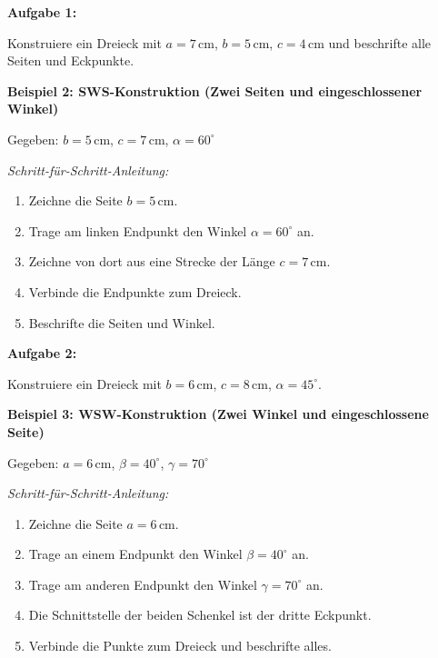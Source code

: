 \vspace{0.5em}

\textbf{Aufgabe 1:}

Konstruiere ein Dreieck mit $a=7\,\mathrm{cm}$, $b=5\,\mathrm{cm}$, $c=4\,\mathrm{cm}$ und beschrifte alle Seiten und Eckpunkte.

\vspace{0.5em}

\textbf{Beispiel 2: SWS-Konstruktion (Zwei Seiten und eingeschlossener Winkel)}

Gegeben: $b=5\,\mathrm{cm}$, $c=7\,\mathrm{cm}$, $\alpha=60^\circ$

\textit{Schritt-für-Schritt-Anleitung:}
\begin{enumerate}
    \item Zeichne die Seite $b=5\,\mathrm{cm}$.
    \item Trage am linken Endpunkt den Winkel $\alpha=60^\circ$ an.
    \item Zeichne von dort aus eine Strecke der Länge $c=7\,\mathrm{cm}$.
    \item Verbinde die Endpunkte zum Dreieck.
    \item Beschrifte die Seiten und Winkel.
\end{enumerate}

\vspace{0.5em}

\textbf{Aufgabe 2:}

Konstruiere ein Dreieck mit $b=6\,\mathrm{cm}$, $c=8\,\mathrm{cm}$, $\alpha=45^\circ$.

\vspace{0.5em}

\textbf{Beispiel 3: WSW-Konstruktion (Zwei Winkel und eingeschlossene Seite)}

Gegeben: $a=6\,\mathrm{cm}$, $\beta=40^\circ$, $\gamma=70^\circ$

\textit{Schritt-für-Schritt-Anleitung:}
\begin{enumerate}
    \item Zeichne die Seite $a=6\,\mathrm{cm}$.
    \item Trage an einem Endpunkt den Winkel $\beta=40^\circ$ an.
    \item Trage am anderen Endpunkt den Winkel $\gamma=70^\circ$ an.
    \item Die Schnittstelle der beiden Schenkel ist der dritte Eckpunkt.
    \item Verbinde die Punkte zum Dreieck und beschrifte alles.
\end{enumerate}

